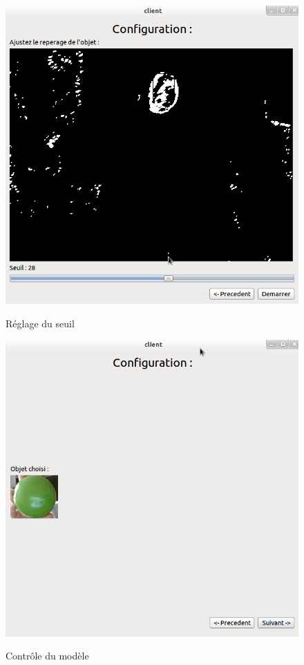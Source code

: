 \documentclass{report}
\begin{document}
				\begin{figure}[!h]
						\centering
						\includegraphics[scale=0.4]{../images/Capture2.png}\\
						\caption{Réglage du seuil}
						\label{Réglage du seuil}
				\end{figure}
				\newpage
				\begin{figure}[!h]
						\centering
						\includegraphics[scale=0.4]{../images/Capture7.png}\\
						\caption{Contrôle du modèle}
						\label{Contrôle du modèle}
				\end{figure}
\end{document}
